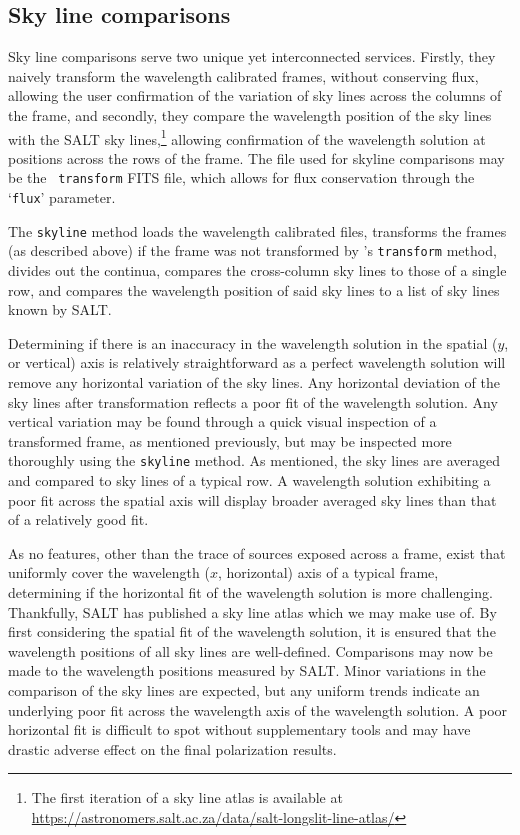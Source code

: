 \subsection{Sky line comparisons}\label{subsec:skyline_discuss}

Sky line comparisons serve two unique yet interconnected services. Firstly, they naively transform the wavelength calibrated frames, without conserving flux, allowing the user confirmation of the variation of sky lines across the columns of the frame, and secondly, they compare the wavelength position of the sky lines with the \gls{SALT} sky lines,\footnote{The first iteration of a sky line atlas is available at \url{https://astronomers.salt.ac.za/data/salt-longslit-line-atlas/}} allowing confirmation of the wavelength solution at positions across the rows of the frame. The file used for skyline comparisons may be the \iraf\ \texttt{transform} \gls{FITS} file, which allows for flux conservation through the `\texttt{flux}' parameter.
\prgph

The \texttt{skyline} method loads the wavelength calibrated files, transforms the frames (as described above) if the frame was not transformed by \iraf's \texttt{transform} method, divides out the continua, compares the cross-column sky lines to those of a single row, and compares the wavelength position of said sky lines to a list of sky lines known by \gls{SALT}.

Determining if there is an inaccuracy in the wavelength solution in the spatial ($y$, or vertical) axis is relatively straightforward as a perfect wavelength solution will remove any horizontal variation of the sky lines. Any horizontal deviation of the sky lines after transformation reflects a poor fit of the wavelength solution. Any vertical variation may be found through a quick visual inspection of a transformed frame, as mentioned previously, but may be inspected more thoroughly using the \texttt{skyline} method. As mentioned, the sky lines are averaged and compared to sky lines of a typical row. A wavelength solution exhibiting a poor fit across the spatial axis will display broader averaged sky lines than that of a relatively good fit.
\prgph

As no features, other than the trace of sources exposed across a frame, exist that uniformly cover the wavelength ($x$, horizontal) axis of a typical frame, determining if the horizontal fit of the wavelength solution is more challenging. Thankfully, \gls{SALT} has published a sky line atlas which we may make use of. By first considering the spatial fit of the wavelength solution, it is ensured that the wavelength positions of all sky lines are well-defined. Comparisons may now be made to the wavelength positions measured by \gls{SALT}. Minor variations in the comparison of the sky lines are expected, but any uniform trends indicate an underlying poor fit across the wavelength axis of the wavelength solution. A poor horizontal fit is difficult to spot without supplementary tools and may have drastic adverse effect on the final polarization results.


